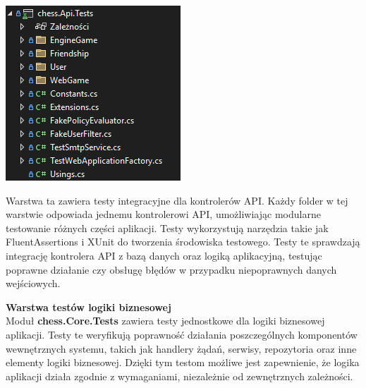 \documentclass[12pt,a4paper]{article}
\begin{document}
\vspace{0.5cm}
\begin{minipage}[t]{0.45\textwidth}
    \vspace{0pt}
    \centering
    \includegraphics[width=\linewidth]{images/struktura_back_api_tests.png} 
\end{minipage}
\hfill
\begin{minipage}[t]{0.45\textwidth}
    \vspace{0pt}
    \raggedright
    Warstwa ta zawiera testy integracyjne dla kontrolerów API. Każdy folder w tej warstwie odpowiada jednemu kontrolerowi API, umożliwiając modularne testowanie różnych części aplikacji. Testy wykorzystują narzędzia takie jak FluentAssertions i XUnit do tworzenia środowiska testowego. Testy te sprawdzają integrację kontrolera API z bazą danych oraz logiką aplikacyjną, testując poprawne działanie czy obsługę błędów w przypadku niepoprawnych danych wejściowych.
\end{minipage}
\vspace{0.5cm}

\noindent \textbf{Warstwa testów logiki biznesowej}\\
Moduł \textbf{chess.Core.Tests} zawiera testy jednostkowe dla logiki biznesowej aplikacji. Testy te weryfikują poprawność działania poszczególnych komponentów wewnętrznych systemu, takich jak handlery żądań, serwisy, repozytoria oraz inne elementy logiki biznesowej. Dzięki tym testom możliwe jest zapewnienie, że logika aplikacji działa zgodnie z wymaganiami, niezależnie od zewnętrznych zależności.
\end{document}
